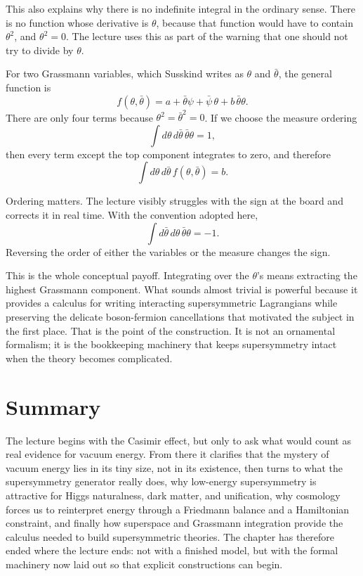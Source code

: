 This also explains why there is no indefinite integral in the ordinary sense. There is no function whose derivative is \(\theta\), because that function would have to contain \(\theta^2\), and \(\theta^2=0\). The lecture uses this as part of the warning that one should not try to divide by \(\theta\).

For two Grassmann variables, which Susskind writes as \(\theta\) and \(\bar\theta\), the general function is
\begin{equation}
f(\theta,\bar\theta)=a+\bar\theta\psi+\bar\psi\,\theta+b\,\bar\theta\theta.
\end{equation}
There are only four terms because \(\theta^2=\bar\theta^2=0\). If we choose the measure ordering
\begin{equation}
\int d\theta\,d\bar\theta\,\bar\theta\theta=1,
\end{equation}
then every term except the top component integrates to zero, and therefore
\begin{equation}
\int d\theta\,d\bar\theta\,f(\theta,\bar\theta)=b.
\end{equation}

\begin{remark}
Ordering matters. The lecture visibly struggles with the sign at the board and corrects it in real time. With the convention adopted here,
\[
\int d\bar\theta\,d\theta\,\bar\theta\theta=-1.
\]
Reversing the order of either the variables or the measure changes the sign.
\end{remark}

This is the whole conceptual payoff. Integrating over the \(\theta\)'s means extracting the highest Grassmann component. What sounds almost trivial is powerful because it provides a calculus for writing interacting supersymmetric Lagrangians while preserving the delicate boson-fermion cancellations that motivated the subject in the first place. That is the point of the construction. It is not an ornamental formalism; it is the bookkeeping machinery that keeps supersymmetry intact when the theory becomes complicated.

\section{Summary}

The lecture begins with the Casimir effect, but only to ask what would count as real evidence for vacuum energy. From there it clarifies that the mystery of vacuum energy lies in its tiny size, not in its existence, then turns to what the supersymmetry generator really does, why low-energy supersymmetry is attractive for Higgs naturalness, dark matter, and unification, why cosmology forces us to reinterpret energy through a Friedmann balance and a Hamiltonian constraint, and finally how superspace and Grassmann integration provide the calculus needed to build supersymmetric theories. The chapter has therefore ended where the lecture ends: not with a finished model, but with the formal machinery now laid out so that explicit constructions can begin.